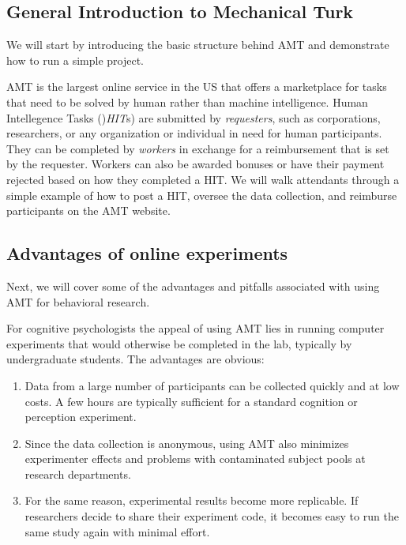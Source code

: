 \documentclass[10pt,letterpaper]{article}
\begin{document}
\subsection{General Introduction to Mechanical Turk}
We will start by introducing the basic structure behind AMT and demonstrate how to run a simple project.

AMT is the largest online service in the US that offers a marketplace for tasks that need to be solved by human rather than machine intelligence.
Human Intellegence Tasks ()\emph{HIT}s) are submitted by \emph{requesters}, such as corporations, researchers, or any organization or individual in need for human participants. 
They can be completed by \emph{workers} in exchange for a reimbursement that is set by the requester.
Workers can also be awarded bonuses or have their payment rejected based on how they completed a HIT.
We will walk attendants through a simple example of how to post a HIT, oversee the data collection, and reimburse participants on the AMT website.


\subsection{Advantages of online experiments}
Next, we will cover some of the advantages and pitfalls associated with using AMT for behavioral research.

For cognitive psychologists the appeal of using AMT lies in running computer experiments that would otherwise be completed in the lab, typically by undergraduate students. 
The advantages are obvious:
\begin{enumerate}
\item
Data from a large number of participants can be collected  quickly and at low costs. A few hours are typically sufficient for a standard cognition or perception experiment. 
\item
Since the data collection is anonymous, using AMT also minimizes experimenter effects and problems with contaminated subject pools at research departments. 
\item For the same reason, experimental results become more replicable. If researchers decide to share their experiment code, it becomes easy to run the same study again with minimal effort.
\end{enumerate}
\end{document}

